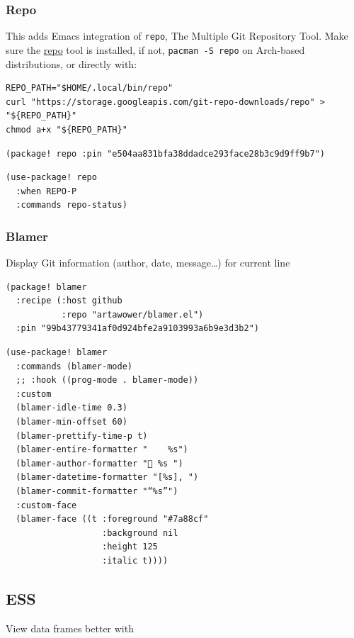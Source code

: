 \documentclass[11pt]{article}
\begin{document}
\subsubsection{Repo}
\label{sec:org65ea183}
This adds Emacs integration of \texttt{repo}, The Multiple Git Repository Tool. Make sure
the \href{https://gerrit.googlesource.com/git-repo}{repo} tool is installed, if not, \texttt{pacman -S repo} on Arch-based distributions,
or directly with:

\begin{verbatim}
REPO_PATH="$HOME/.local/bin/repo"
curl "https://storage.googleapis.com/git-repo-downloads/repo" > "${REPO_PATH}"
chmod a+x "${REPO_PATH}"
\end{verbatim}

\begin{verbatim}
(package! repo :pin "e504aa831bfa38ddadce293face28b3c9d9ff9b7")
\end{verbatim}

\begin{verbatim}
(use-package! repo
  :when REPO-P
  :commands repo-status)
\end{verbatim}

\subsubsection{Blamer}
\label{sec:org8bdcd57}
Display Git information (author, date, message\ldots{}) for current line

\begin{verbatim}
(package! blamer
  :recipe (:host github
           :repo "artawower/blamer.el")
  :pin "99b43779341af0d924bfe2a9103993a6b9e3d3b2")
\end{verbatim}

\begin{verbatim}
(use-package! blamer
  :commands (blamer-mode)
  ;; :hook ((prog-mode . blamer-mode))
  :custom
  (blamer-idle-time 0.3)
  (blamer-min-offset 60)
  (blamer-prettify-time-p t)
  (blamer-entire-formatter "    %s")
  (blamer-author-formatter " %s ")
  (blamer-datetime-formatter "[%s], ")
  (blamer-commit-formatter "“%s”")
  :custom-face
  (blamer-face ((t :foreground "#7a88cf"
                   :background nil
                   :height 125
                   :italic t))))
\end{verbatim}

\subsection{ESS}
\label{sec:orge3f40b0}
View data frames better with
\end{document}
